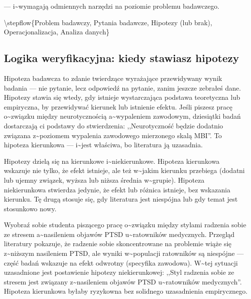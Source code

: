 \documentclass[12pt,a4paper,twoside,openany]{book}
\begin{document}
--- i\textasciitilde{}wymagają odmiennych narzędzi na poziomie problemu badawczego.


\textbackslash{}stepflow\{Problem badawczy, Pytania badawcze, Hipotezy (lub brak), Operacjonalizacja, Analiza danych\}


\subsection{Logika weryfikacyjna: kiedy stawiasz hipotezy}


Hipoteza badawcza to zdanie twierdzące wyrażające przewidywany wynik badania --- nie pytanie, lecz odpowiedź na pytanie, zanim jeszcze zebrałeś dane. Hipotezy stawia się wtedy, gdy istnieje wystarczająca podstawa teoretyczna lub empiryczna, by przewidywać kierunek lub istnienie efektu. Jeśli piszesz pracę o\textasciitilde{}związku między neurotycznością a\textasciitilde{}wypaleniem zawodowym, dziesiątki badań dostarczają ci podstawy do stwierdzenia: ,,Neurotyczność będzie dodatnio związana z\textasciitilde{}poziomem wypalenia zawodowego mierzonego skalą MBI''. To hipoteza kierunkowa --- i\textasciitilde{}jest właściwa, bo literatura ją uzasadnia.


Hipotezy dzielą się na kierunkowe i\textasciitilde{}niekierunkowe. Hipoteza kierunkowa wskazuje nie tylko, że efekt istnieje, ale też w\textasciitilde{}jakim kierunku przebiega (dodatni lub ujemny związek, wyższa lub niższa średnia w\textasciitilde{}grupie). Hipoteza niekierunkowa stwierdza jedynie, że efekt lub różnica istnieje, bez wskazania kierunku. Tę drugą stosuje się, gdy literatura jest niespójna lub gdy temat jest stosunkowo nowy.


\begin{examplebox} Wyobraź sobie studenta piszącego pracę o\textasciitilde{}związku między stylami radzenia sobie ze stresem a\textasciitilde{}nasileniem objawów PTSD u\textasciitilde{}ratowników medycznych. Przegląd literatury pokazuje, że radzenie sobie skoncentrowane na problemie wiąże się z\textasciitilde{}niższym nasileniem PTSD, ale wyniki w\textasciitilde{}populacji ratowników są niespójne --- część badań wskazuje na efekt odwrotny (specyfika zawodowa). W\textasciitilde{}tej sytuacji uzasadnione jest postawienie hipotezy niekierunkowej: ,,Styl radzenia sobie ze stresem jest związany z\textasciitilde{}nasileniem objawów PTSD u\textasciitilde{}ratowników medycznych''. Hipoteza kierunkowa byłaby ryzykowna bez solidnego uzasadnienia empirycznego.
\end{examplebox}
\end{document}
